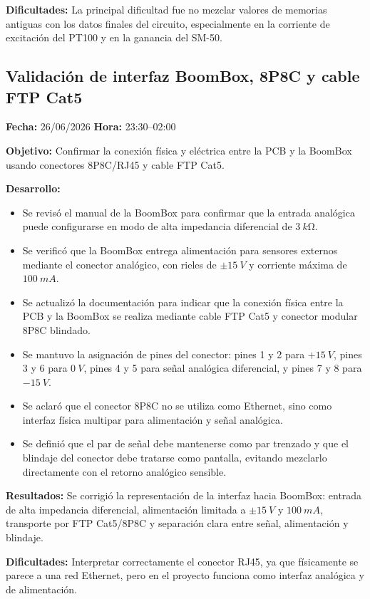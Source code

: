 \documentclass[12pt]{article}
\begin{document}
\textbf{Dificultades:}
La principal dificultad fue no mezclar valores de memorias antiguas con los datos finales del circuito, especialmente en la corriente de excitación del PT100 y en la ganancia del SM-50.

\subsection{Validación de interfaz BoomBox, 8P8C y cable FTP Cat5}
\textbf{Fecha:} 26/06/2026 \quad \textbf{Hora:} 23:30--02:00

\textbf{Objetivo:}
Confirmar la conexión física y eléctrica entre la PCB y la BoomBox usando conectores 8P8C/RJ45 y cable FTP Cat5.

\textbf{Desarrollo:}
\begin{itemize}
\item Se revisó el manual de la BoomBox para confirmar que la entrada analógica puede configurarse en modo de alta impedancia diferencial de \(\SI{3}{k\ohm}\).
\item Se verificó que la BoomBox entrega alimentación para sensores externos mediante el conector analógico, con rieles de \(\pm\SI{15}{V}\) y corriente máxima de \(\SI{100}{mA}\).
\item Se actualizó la documentación para indicar que la conexión física entre la PCB y la BoomBox se realiza mediante cable FTP Cat5 y conector modular 8P8C blindado.
\item Se mantuvo la asignación de pines del conector: pines 1 y 2 para \(+\SI{15}{V}\), pines 3 y 6 para \(\SI{0}{V}\), pines 4 y 5 para señal analógica diferencial, y pines 7 y 8 para \(-\SI{15}{V}\).
\item Se aclaró que el conector 8P8C no se utiliza como Ethernet, sino como interfaz física multipar para alimentación y señal analógica.
\item Se definió que el par de señal debe mantenerse como par trenzado y que el blindaje del conector debe tratarse como pantalla, evitando mezclarlo directamente con el retorno analógico sensible.
\end{itemize}

\textbf{Resultados:}
Se corrigió la representación de la interfaz hacia BoomBox: entrada de alta impedancia diferencial, alimentación limitada a \(\pm\SI{15}{V}\) y \(\SI{100}{mA}\), transporte por FTP Cat5/8P8C y separación clara entre señal, alimentación y blindaje.

\textbf{Dificultades:}
Interpretar correctamente el conector RJ45, ya que físicamente se parece a una red Ethernet, pero en el proyecto funciona como interfaz analógica y de alimentación.
\end{document}
